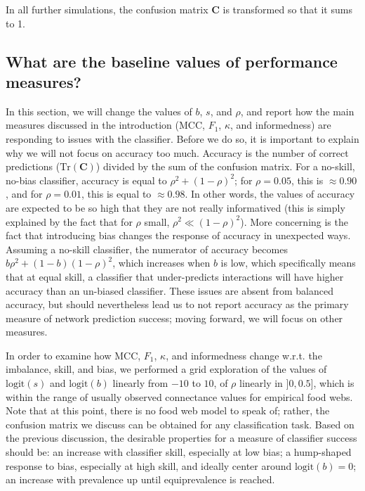 \documentclass[11pt]{article}
\begin{document}
In all further simulations, the confusion matrix \(\mathbf{C}\) is
transformed so that it sums to 1.

\hypertarget{what-are-the-baseline-values-of-performance-measures}{%
\subsection{What are the baseline values of performance
measures?}\label{what-are-the-baseline-values-of-performance-measures}}

In this section, we will change the values of \(b\), \(s\), and
\(\rho\), and report how the main measures discussed in the introduction
(MCC, \(F_1\), \(\kappa\), and informedness) are responding to issues
with the classifier. Before we do so, it is important to explain why we
will not focus on accuracy too much. Accuracy is the number of correct
predictions (\(\text{Tr}(\mathbf{C})\)) divided by the sum of the
confusion matrix. For a no-skill, no-bias classifier, accuracy is equal
to \(\rho^2 + (1-\rho)^2\); for \(\rho = 0.05\), this is
\(\approx 0.90\), and for \(\rho = 0.01\), this is equal to
\(\approx 0.98\). In other words, the values of accuracy are expected to
be so high that they are not really informatived (this is simply
explained by the fact that for \(\rho\) small,
\(\rho^2 \ll (1-\rho)^2\)). More concerning is the fact that introducing
bias changes the response of accuracy in unexpected ways. Assuming a
no-skill classifier, the numerator of accuracy becomes
\(b\rho^2 + (1-b)(1-\rho)^2\), which increases when \(b\) is low, which
specifically means that at equal skill, a classifier that under-predicts
interactions will have higher accuracy than an un-biased classifier.
These issues are absent from balanced accuracy, but should nevertheless
lead us to not report accuracy as the primary measure of network
prediction success; moving forward, we will focus on other measures.

In order to examine how MCC, \(F_1\), \(\kappa\), and informedness
change w.r.t. the imbalance, skill, and bias, we performed a grid
exploration of the values of \(\text{logit}(s)\) and \(\text{logit}(b)\)
linearly from \(-10\) to \(10\), of \(\rho\) linearly in \(]0, 0.5]\),
which is within the range of usually observed connectance values for
empirical food webs. Note that at this point, there is no food web model
to speak of; rather, the confusion matrix we discuss can be obtained for
any classification task. Based on the previous discussion, the desirable
properties for a measure of classifier success should be: an increase
with classifier skill, especially at low bias; a hump-shaped response to
bias, especially at high skill, and ideally center around
\(\text{logit}(b)=0\); an increase with prevalence up until
equiprevalence is reached.
\end{document}
